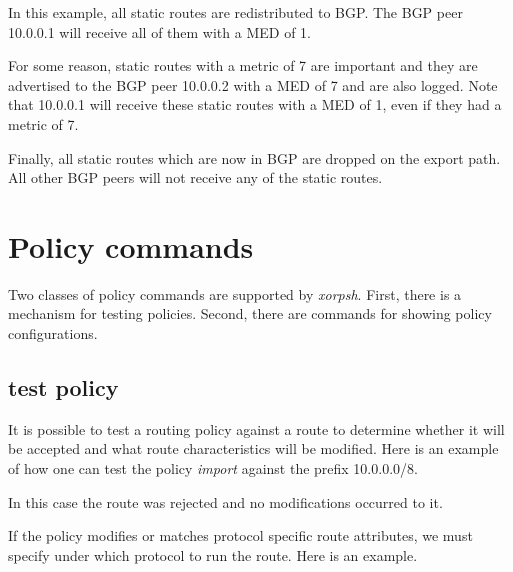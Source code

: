 In this example, all static routes are redistributed to BGP.  The BGP peer
10.0.0.1 will receive all of them with a MED of 1.  

For some reason, static routes with a metric of 7 are important and they are
advertised to the BGP peer 10.0.0.2 with a MED of 7 and are also logged.  Note
that 10.0.0.1 will receive these static routes with a MED of 1, even if they had
a metric of 7.

Finally, all static routes which are now in BGP are dropped on the export path.
All other BGP peers will not receive any of the static routes.

\section{Policy commands}
Two classes of policy commands are supported by {\em xorpsh}.  First, there is a
mechanism for testing policies.  Second, there are commands for showing policy
configurations.

\subsection{test policy}
It is possible to test a routing policy against a route to determine whether it
will be accepted and what route characteristics will be modified.  Here is an
example of how one can test the policy {\em import} against the prefix 10.0.0.0/8.

\noindent{}

In this case the route was rejected and no modifications occurred to it.  

If the policy modifies or matches protocol specific route attributes, we must
specify under which protocol to run the route.  Here is an example.

\noindent{}

